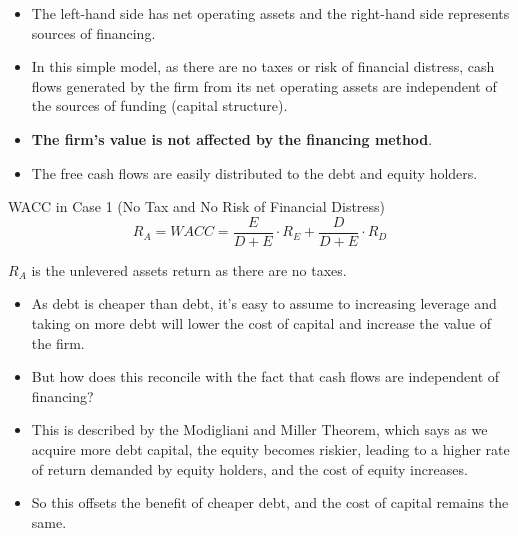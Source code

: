 \begin{itemize}
    \item The left-hand side has net operating assets and the right-hand side represents sources of financing. 
    \item In this simple model, as there are no taxes or risk of financial distress, cash flows generated by the firm from its net operating assets are independent of the sources of funding (capital structure). 
    \item \textbf{The firm's value is not affected by the financing method}. 
    \item The free cash flows are easily distributed to the debt and equity holders.
\end{itemize}

\begin{definitionbox}{WACC in Case 1 (No Tax and No Risk of Financial Distress)}
    \begin{equation}
        R_A = WACC = \frac{E}{D+E} \cdot R_E + \frac{D}{D+E} \cdot R_D
    \end{equation}
\end{definitionbox}

$R_A$ is the unlevered assets return as there are no taxes.

\begin{itemize}
    \item As debt is cheaper than debt, it's easy to assume to increasing leverage and taking on more debt will lower the cost of capital and increase the value of the firm.
    \item But how does this reconcile with the fact that cash flows are independent of financing?
    \item This is described by the Modigliani and Miller Theorem, which says as we acquire more debt capital, the equity becomes riskier, leading to a higher rate of return demanded by equity holders, and the cost of equity increases.
    \item So this offsets the benefit of cheaper debt, and the cost of capital remains the same.
\end{itemize}

